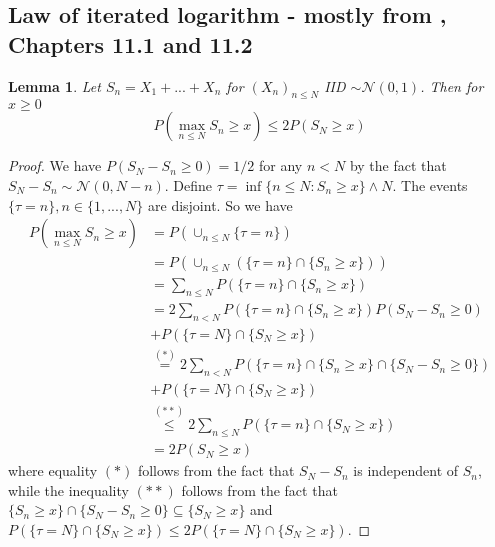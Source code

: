 \documentclass[]{interact}
\theoremstyle{plain}%
\newtheorem{lemma}[theorem]{Lemma}
\theoremstyle{definition}
\theoremstyle{remark}
\begin{document}
\subsection{Law of iterated logarithm - mostly from \cite{PollardUGMTP}, Chapters 11.1 and 11.2}

\begin{lemma} 
\label{gaussian_maximal_inequality}	
Let $S_n=X_1+...+X_n$ for $(X_n)_{n\leq N}$ IID $\sim \mathcal{N}(0,1)$. Then for $x\geq 0$
$${P(\max_{n\leq N}S_n\geq x)\leq  2P(S_N\geq x)}$$
\end{lemma}
\begin{proof} We have $P(S_N-S_n\geq 0)=1/2$ for any $n<N$ by the fact that $S_N-S_n\sim \mathcal{N}(0,N-n)$. Define $\tau=\inf\{n\leq N:S_n\geq x\}\wedge N$. The events $\{\tau=n\},n \in \{1,...,N\}$ are disjoint. So we have
$$\begin{aligned}P(\max_{n\leq N}S_n\geq x)&=P(\cup_{n\leq N}\{\tau=n\})\\
&= P(\cup_{n\leq N}(\{\tau=n\}\cap\{S_n\geq x\}))\\
&=\sum_{n\leq N}P(\{\tau=n\}\cap\{S_n\geq x\})\\
&=2\sum_{n< N}P(\{\tau=n\}\cap\{S_n\geq x\})P(S_N-S_n\geq 0)\\
&+P(\{\tau=N\}\cap\{S_N\geq x\})\\
&\stackrel{(*)}{=}2\sum_{n< N}P(\{\tau=n\}\cap\{S_n\geq x\}\cap\{S_N-S_n\geq 0\})\\
&+P(\{\tau=N\}\cap\{S_N\geq x\})\\
&\stackrel{(**)}{\leq} 2\sum_{n\leq N}P(\{\tau=n\}\cap\{S_N\geq x\})\\
&=2P(S_N\geq x)
\end{aligned}$$
where equality $(*)$ follows from the fact that $S_N-S_n$ is independent of $S_n$, while the inequality $(**)$ follows from the fact that $\{S_n\geq x\}\cap\{S_N-S_n\geq 0\}\subseteq \{S_N\geq x\}$ and $P(\{\tau=N\}\cap\{S_N\geq x\})\leq 2P(\{\tau=N\}\cap\{S_N\geq x\})$.
\end{proof}
\end{document}
